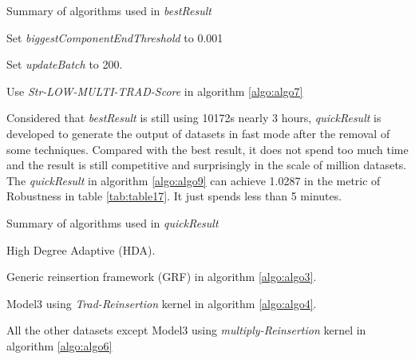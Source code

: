 \documentclass{article}
\begin{document}
	\begin{algorithm}[!htbp]
		\caption{ Summary of algorithms used in \textit{bestResult} }
		\label{algo:algo8}
		\begin{algorithmic}[1]
			\State Set \textit{biggestComponentEndThreshold} to 0.001
			
			\State Set \textit{updateBatch} to 200.
			
			\State Use \textit{Str-LOW-MULTI-TRAD-Score} in algorithm \ref{algo:algo7}
						
			
		\end{algorithmic}
	\end{algorithm}


	Considered that \textit{bestResult} is still using 10172s nearly 3 hours, \textit{quickResult} is developed to generate the output of datasets in fast mode after the removal of some techniques. Compared with the best result, it does not spend too much time and the result is still competitive and surprisingly in the scale of million datasets. The \textit{quickResult} in algorithm \ref{algo:algo9} can achieve 1.0287 in the metric of Robustness in table \ref{tab:table17}. It just spends less than 5 minutes.
	
	
	\begin{algorithm}[!htbp]
		\caption{ Summary of algorithms used in \textit{quickResult} }
		\label{algo:algo9}
		\begin{algorithmic}[1]
			
			\State High Degree Adaptive (HDA).

			\State Generic reinsertion framework (GRF) in algorithm \ref{algo:algo3}.
			
			\State Model3 using \textit{Trad-Reinsertion} kernel in algorithm \ref{algo:algo4}.
			
			\State All the other datasets except Model3 using \textit{multiply-Reinsertion} kernel in algorithm \ref{algo:algo6}
			
		\end{algorithmic}
	\end{algorithm}
	
	
	
\end{document}
